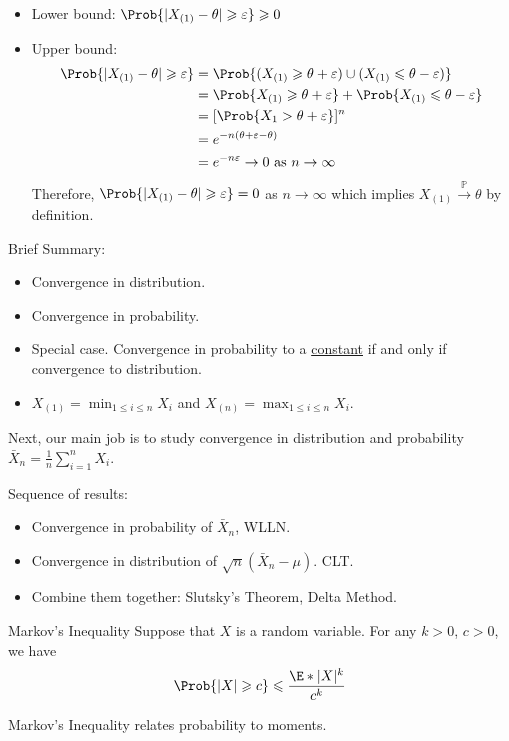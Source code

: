 \begin{Example}{}{}
\begin{itemize}
        \item Lower bound: $ \Prob{\abs{X_{(1)}-\theta}\geqslant \varepsilon}\geqslant 0 $
        \item Upper bound:
              \begin{align*}
                  \Prob{\abs{X_{(1)}-\theta}\geqslant \varepsilon}
                   & =\Prob{(X_{(1)}\geqslant \theta+\varepsilon)\cup
                  (X_{(1)}\leqslant \theta-\varepsilon)}              \\
                   & =\Prob{X_{(1)}\geqslant \theta+\varepsilon}+
                  \Prob{X_{(1)}\leqslant \theta-\varepsilon}          \\
                   & =[\Prob{X_1>\theta+\varepsilon}]^n               \\
                   & =e^{-n(\theta+\varepsilon-\theta)}               \\
                   & =e^{-n\varepsilon}\to 0\text{ as }n\to\infty
              \end{align*}
              Therefore, $ \Prob{\abs{X_{(1)}-\theta}\geqslant \varepsilon}=0 $
              as $ n\to\infty $ which implies $ X_{(1)}\stackrel{\mathbb{P}}{\to}\theta $
              by definition.
    \end{itemize}
\end{Example}
Brief Summary:
\begin{itemize}
    \item Convergence in distribution.
    \item Convergence in probability.
    \item Special case. Convergence in probability
          to a \underline{constant} if and only if convergence to distribution.
    \item $ X_{(1)}=\min_{1\leqslant i\leqslant n}X_i $
          and $ X_{(n)}=\max_{1\leqslant i\leqslant n}X_i $.
\end{itemize}
Next, our main job is to study convergence in distribution
and probability $ \bar{X}_n=\frac{1}{n} \sum_{i=1}^{n} X_i $.

Sequence of results:
\begin{itemize}
    \item Convergence in probability of $ \bar{X}_n $,
          WLLN\@.
    \item Convergence in distribution of $ \sqrt{n}(\bar{X}_n-\mu) $. CLT\@.
    \item Combine them together: Slutsky's Theorem, Delta Method.
\end{itemize}
\begin{Theorem}{Markov's Inequality}{}
    Suppose that $ X $ is a random variable. For any $ k>0 $,
    $ c>0 $, we have
    \[ \Prob{\abs{X}\geqslant c}\leqslant \frac{\E*{\abs{X}^k}}{c^k}  \]
\end{Theorem}
Markov's Inequality relates probability to moments.

